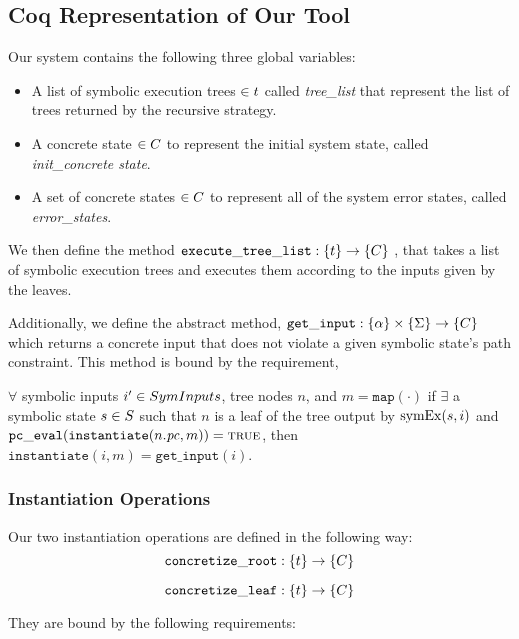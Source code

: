 \subsection{Coq Representation of Our Tool}
Our system contains the following three global variables:
\begin{itemize}
\item A list of symbolic execution trees $\in t$ called \textit{tree\_list} that represent the list of trees returned by the recursive strategy.
\item A concrete state $\in C$ to represent the initial system state, called \textit{init\_concrete state}.
\item A set of concrete states $\in C$ to represent all of the system error states, called \textit{error\_states}.
\end{itemize}

We then define the method $ \mathtt{execute\_tree\_list} : \{t\} \rightarrow \{C\}$ , that takes a list of symbolic execution trees and executes them according to the inputs given by the leaves.

Additionally, we define the abstract method, $ \mathtt{get\_input} : \{\alpha\} \times \{\Sigma\} \rightarrow \{C\}$ which returns a concrete input that does not violate a given symbolic state's path constraint.
This method is bound by the requirement,

\begin{definition}
$ \forall$ symbolic inputs $i' \in SymInputs$, tree nodes $n$, and $m = \mathtt{map(\cdot)}$
if $\exists$ a symbolic state $s \in S$  such that
$n$ is a leaf of the tree output by $\mathrm{symEx}(s, i)$ and 
$\mathtt{pc\_eval} (\mathtt{instantiate} (n.\mathit{pc}, m)) = \mathtt{\textsc{true}}$, then
$\mathtt{instantiate}(i, m) = \mathtt{get\_input}(i)$.
\end{definition}

\subsubsection{Instantiation Operations}

Our two instantiation operations are defined in the following way: 
$$\mathtt{concretize\_root} : \{ t \} \rightarrow \{C\}$$

$$\mathtt{concretize\_leaf} : \{ t \} \rightarrow \{C\}$$

They are bound by the following requirements:

